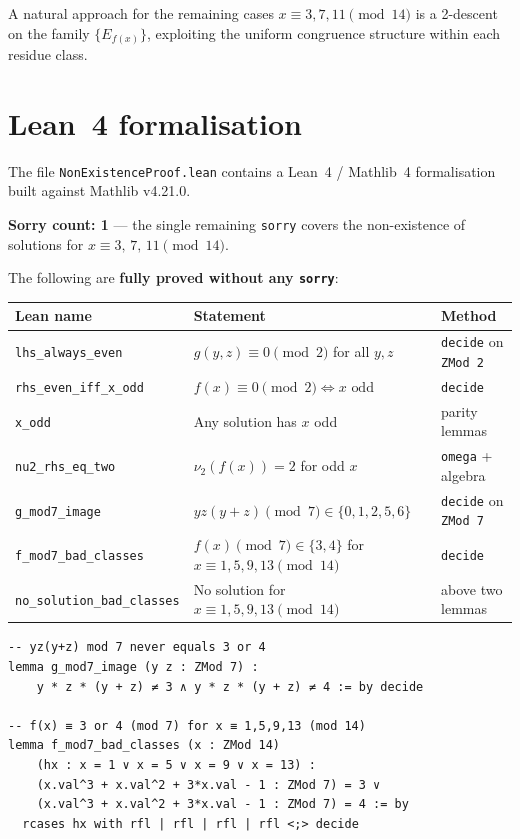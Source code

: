 \documentclass[12pt, a4paper]{article}
\theoremstyle{definition}
\begin{document}
A natural approach for the remaining cases $x\equiv3,7,11\pmod{14}$
is a 2-descent on the family $\{E_{f(x)}\}$, exploiting the uniform
congruence structure within each residue class.

\section{Lean~4 formalisation}
\label{sec:lean}

The file \texttt{NonExistenceProof.lean} contains a Lean~4 / Mathlib~4
formalisation built against Mathlib v4.21.0.

\textbf{Sorry count: 1} — the single remaining \texttt{sorry} covers
the non-existence of solutions for $x\equiv3,\,7,\,11\pmod{14}$.

\medskip
The following are \textbf{fully proved without any \texttt{sorry}}:

\begin{center}
\begin{tabular}{lll}
\toprule
Lean name & Statement & Method\\\midrule
\texttt{lhs\_always\_even} & $g(y,z)\equiv0\pmod2$ for all $y,z$ & \texttt{decide} on \texttt{ZMod 2}\\
\texttt{rhs\_even\_iff\_x\_odd} & $f(x)\equiv0\pmod2\iff x\text{ odd}$ & \texttt{decide}\\
\texttt{x\_odd} & Any solution has $x$ odd & parity lemmas\\
\texttt{nu2\_rhs\_eq\_two} & $\nu_2(f(x))=2$ for odd $x$ & \texttt{omega} + algebra\\
\texttt{g\_mod7\_image} & $yz(y+z)\pmod7\in\{0,1,2,5,6\}$ & \texttt{decide} on \texttt{ZMod 7}\\
\texttt{f\_mod7\_bad\_classes} & $f(x)\pmod7\in\{3,4\}$ for $x\equiv1,5,9,13\pmod{14}$ & \texttt{decide}\\
\texttt{no\_solution\_bad\_classes} & No solution for $x\equiv1,5,9,13\pmod{14}$ & above two lemmas\\
\bottomrule
\end{tabular}
\end{center}

\begin{lstlisting}[language=Lean4,caption={Key excerpt from NonExistenceProof.lean}]
-- yz(y+z) mod 7 never equals 3 or 4
lemma g_mod7_image (y z : ZMod 7) :
    y * z * (y + z) ≠ 3 ∧ y * z * (y + z) ≠ 4 := by decide

-- f(x) ≡ 3 or 4 (mod 7) for x ≡ 1,5,9,13 (mod 14)
lemma f_mod7_bad_classes (x : ZMod 14) 
    (hx : x = 1 ∨ x = 5 ∨ x = 9 ∨ x = 13) :
    (x.val^3 + x.val^2 + 3*x.val - 1 : ZMod 7) = 3 ∨
    (x.val^3 + x.val^2 + 3*x.val - 1 : ZMod 7) = 4 := by
  rcases hx with rfl | rfl | rfl | rfl <;> decide
\end{lstlisting}
\end{document}
